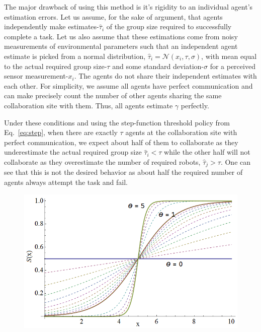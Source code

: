 \documentclass[conference]{ieeeconf}
\def\estt{\hat{\tau}}
\def\estg{\gamma}
\begin{document}
The major drawback of using this method is it's rigidity to an individual agent's estimation errors. Let us assume, for the sake of argument, that agents independently make estimates-$\estt_i$ of the group size required to successfully complete a task. Let us also assume that these estimations come from noisy measurements of environmental parameters such that an independent agent estimate is picked from a normal distribution, $\estt_i = \mathcal{N}(x_i, \tau, \sigma)$, with mean equal to the actual required group size-$\tau$ and some standard deviation-$\sigma$ for a perceived sensor measurement-$x_i$. The agents do not share their independent estimates with each other. For simplicity, we assume all agents have perfect communication and can make precisely count the number of other agents sharing the same collaboration site with them. Thus, all agents estimate $\estg$ perfectly.

Under these conditions and using the step-function threshold policy from Eq.~\ref{eq:step}, when there are exactly $\tau$ agents at the collaboration site with perfect communication, we expect about half of them to collaborate as they underestimate the actual required group size $\estt_i < \tau$ while the other half will not collaborate as they overestimate the number of required robots, $\estt_j > \tau$. One can see that this is not the desired behavior as about half the required number of agents always attempt the task and fail.

\begin{figure}[!ht]
\centering\includegraphics[width=\columnwidth]{../figures/sigmoid1.png}
\centering\caption{}\label{fig:sigmoid}
\end{figure}
\end{document}
